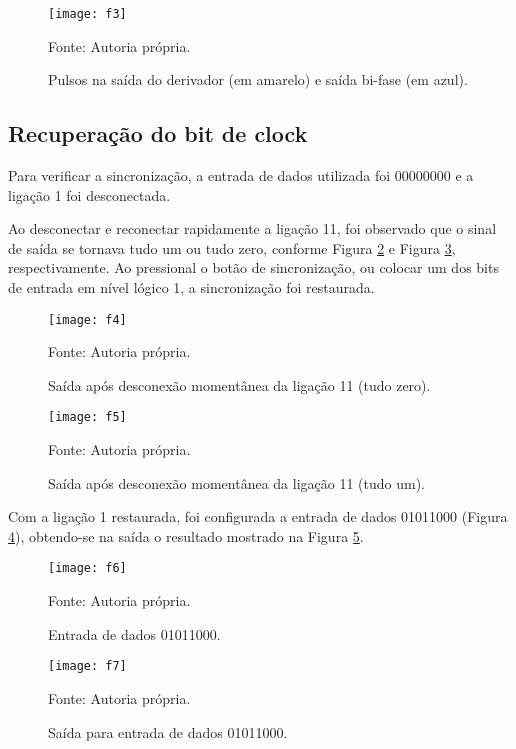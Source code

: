 		\begin{figure}[H]
			\centering
			\caption{Pulsos na saída do derivador (em amarelo) e saída bi-fase (em azul).}
			\texttt{[image: f3]}
			
			\small Fonte: Autoria própria.
			\label{fig:f3}
		\end{figure}

\subsection{Recuperação do bit de clock}

	Para verificar a sincronização, a entrada de dados utilizada foi 00000000 e a ligação 1 foi desconectada.
	
	Ao desconectar e reconectar rapidamente a ligação 11, foi observado que o sinal de saída se tornava tudo um ou tudo zero, conforme Figura \ref{fig:f4_2} e Figura \ref{fig:f5}, respectivamente. Ao pressional o botão de sincronização, ou colocar um dos bits de entrada em nível lógico 1, a sincronização foi restaurada.
	
	\begin{figure}[H]
		\centering
		\caption{Saída após desconexão momentânea da ligação 11 (tudo zero).}
		\texttt{[image: f4]}
				
		\small Fonte: Autoria própria.
		\label{fig:f4_2}
	\end{figure}
			
	\begin{figure}[H]
		\centering
		\caption{Saída após desconexão momentânea da ligação 11 (tudo um).}
		\texttt{[image: f5]}
						
		\small Fonte: Autoria própria.
		\label{fig:f5}
	\end{figure}
	
	Com a ligação 1 restaurada, foi configurada a entrada de dados 01011000 (Figura \ref{fig:f6}), obtendo-se na saída o resultado mostrado na Figura \ref{fig:f7}.
	
	\begin{figure}[H]
		\centering
		\caption{Entrada de dados 01011000.}
		\texttt{[image: f6]}
			
		\small Fonte: Autoria própria.
		\label{fig:f6}
	\end{figure}
	
	\begin{figure}[H]
		\centering
		\caption{Saída para entrada de dados 01011000.}
		\texttt{[image: f7]}
			
		\small Fonte: Autoria própria.
		\label{fig:f7}
	\end{figure}
		

